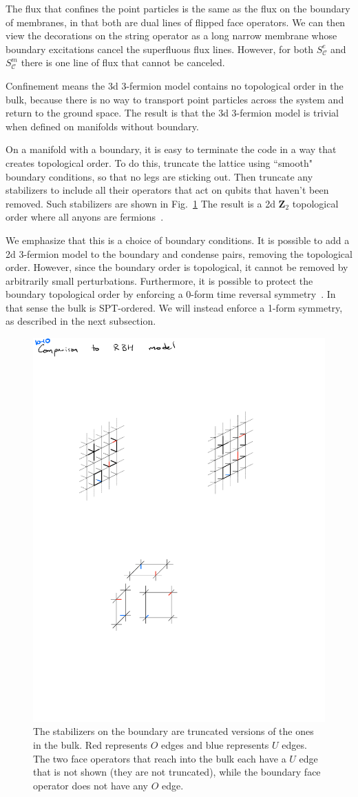 \documentclass[twocolumn, longbibliography]{revtex4-2}
\newcommand{\C}{\mathcal{C}}
\begin{document}
The flux that confines the point particles is the same as the flux on the boundary of membranes, in that both are dual lines of flipped face operators. We can then view the decorations on the string operator as a long narrow membrane whose boundary excitations cancel the superfluous flux lines. However, for both $S^e_\mathcal{C}$ and $S^m_\C$ there is one line of flux that cannot be canceled.

Confinement means the 3d 3-fermion model contains no topological order in the bulk, because there is no way to transport point particles across the system and return to the ground space. The result is that the 3d 3-fermion model is trivial when defined on manifolds without boundary.
	
On a manifold with a boundary, it is easy to terminate the code in a way that creates topological order. To do this, truncate the lattice using ``smooth" boundary conditions, so that no legs are sticking out. Then truncate any stabilizers to include all their operators that act on qubits that haven't been removed. Such stabilizers are shown in Fig.~\ref{fig:bdyops} The result is a 2d $\mathbf{Z}_2$ topological order where all anyons are fermions~\cite{BurnellSoluble}.

We emphasize that this is a choice of boundary conditions. It is possible to add a 2d 3-fermion model to the boundary and condense pairs, removing the topological order. However, since the boundary order is topological, it cannot be removed by arbitrarily small perturbations. Furthermore, it is possible to protect the boundary topological order by enforcing a 0-form time reversal symmetry~\cite{BurnellSoluble}. In that sense the bulk is SPT-ordered. We will instead enforce a 1-form symmetry, as described in the next subsection.
	
\begin{figure}
\centering
\includegraphics[width=.6\linewidth]{bdyops}
\caption{The stabilizers on the boundary are truncated versions of the ones in the bulk. Red represents $O$ edges and blue represents $U$ edges. The two face operators that reach into the bulk each have a $U$ edge that is not shown (they are not truncated), while the boundary face operator does not have any $O$ edge.}
\label{fig:bdyops}
\end{figure}
\end{document}
